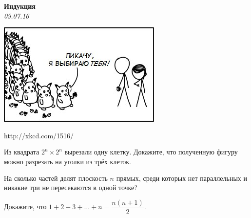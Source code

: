 \begin{center}
\textbf{\Large Индукция}\\
\textit{09.07.16}
\end{center}

\epigraph{\includegraphics[width=.8\textwidth]{ind.jpg}}{http://xkcd.com/1516/}

\begin{problems}
\item Из квадрата $2^n \times 2^n$ вырезали одну клетку. Докажите,
что полученную фигуру можно разрезать на уголки из трёх клеток.

\item
На сколько частей делят плоскость $n$ прямых, среди которых нет
параллельных и никакие три не пересекаются в одной точке?

\item
Докажите, что $1 + 2 + 3 + \ldots + n = \dfrac{n(n+1)}{2}$.

\end{problems}

\resetproblem





